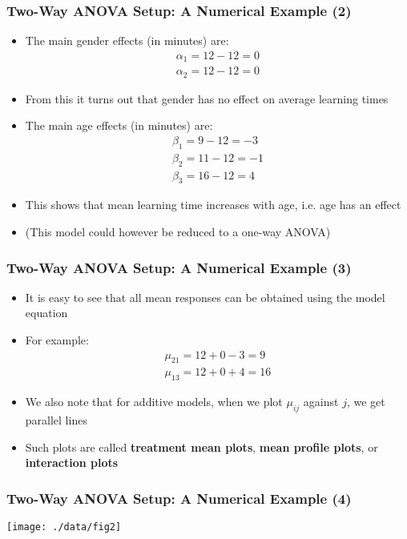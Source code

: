 \documentclass[10pt]{beamer}
\theoremstyle{definition}
\begin{document}
\begin{frame}[fragile]
\frametitle{Two-Way ANOVA Setup: A Numerical Example (2)}
\begin{itemize}
	\item The main gender effects (in minutes) are:
	\[
		\begin{array}{lcl}
			\alpha_{1} = 12 - 12 = 0\\
			\alpha_{2} = 12 - 12 = 0
		\end{array}
	\]
	\item From this it turns out that gender has no effect on average learning times
	\item The main age effects (in minutes) are:
	\[
		\begin{array}{lcl}
			\beta_{1} = 9 - 12 = -3\\
			\beta_{2} = 11 - 12 = -1\\
			\beta_{3} = 16 - 12 = 4
		\end{array}
	\]
	\item This shows that mean learning time increases with age, i.e. age has an effect
	\item (This model could however be reduced to a one-way ANOVA)
\end{itemize}
\end{frame}

\begin{frame}[fragile]
\frametitle{Two-Way ANOVA Setup: A Numerical Example (3)}
\begin{itemize}
	\item It is easy to see that all mean responses can be obtained using the model equation
	\item For example:
	\[
		\begin{array}{lcl}
			\mu_{21} = 12 + 0 - 3 = 9\\
			\mu_{13} = 12 + 0 + 4 = 16
		\end{array}
	\]
	\item We also note that for additive models, when we plot $\mu_{ij}$ against $j$, we get parallel lines
	\item Such plots are called \textbf{treatment mean plots}, \textbf{mean profile plots}, or \textbf{interaction plots}
\end{itemize}
\end{frame}

\begin{frame}[fragile]
\frametitle{Two-Way ANOVA Setup: A Numerical Example (4)}
\centerline{\texttt{[image: ./data/fig2]}}
\end{frame}
\end{document}

